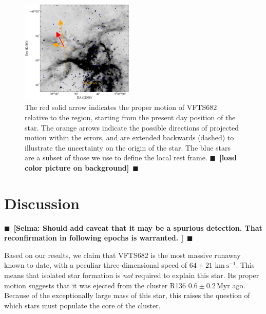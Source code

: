 \documentclass[apjl,twocolumn]{emulateapj}
\newcommand{\todo}[1]{{\large $\blacksquare$~\textbf{\color{red}[#1]}}~$\blacksquare$}
\newcommand{\kms}{{\,\mathrm{km\ s^{-1}}}}
\begin{document}
\begin{figure}[htbp]
  \centering
  \includegraphics[width=0.48\textwidth]{./figures/main_plot_good}  
  \caption{The red solid arrow indicates the proper motion of VFTS682
    relative to the region, starting from the present day position of
    the star. The orange arrows indicate the possible
    directions of projected motion within the errors, and are extended
    backwards (dashed) to illustrate the uncertainty on the origin of the
    star. The blue stars
    are a subset of those we use to define the local rest
    frame. \todo{load color picture on background}}
  
  \label{fig:main}
\end{figure}

\section{Discussion}
\label{sec:discussion}
\todo{Selma: Should add caveat that it may be a spurious detection.  That reconfirmation in following epochs is warranted. }

Based on our results, we claim that VFTS682 is the most massive
runaway known to date, with a peculiar three-dimensional speed of $64\pm21\,\kms$. This means that isolated star formation is
\emph{not} required to explain this star. Its proper motion suggests that it was ejected from the cluster R136
$0.6\pm0.2$\,Myr ago. Because of the exceptionally large mass
of this star, this raises the question of which stars must populate
the core of the cluster.
\end{document}
